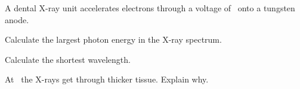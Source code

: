 A dental X-ray unit accelerates electrons through a voltage of \UO\ onto a tungsten anode.

\begin{abcliste}
\abc Calculate the largest photon energy in the X-ray spectrum.

\abc Calculate the shortest wavelength.

\abc At \UbO\ the X-rays get through thicker tissue. Explain why.
\end{abcliste}
